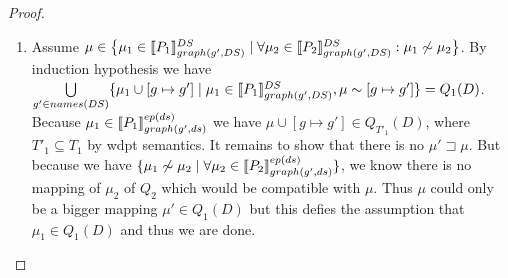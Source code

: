 \begin{proof}
\begin{enumerate}
\begin{enumerate}
				\item Assume $\mu \in \big\{ \mu_1 \in  \llbracket P_1 \rrbracket^{DS}_{graph(g',DS)} \mid 
					\forall \mu_2 \in \llbracket P_2 \rrbracket^{DS}_{graph(g',DS)}: \mu_1 \not\sim \mu_2 \big\}$. 
					By induction hypothesis we have 
					$\bigcup\limits_{g' \in names(DS)} 
					\{ \mu_1 \cup [g \mapsto g'] \mid \mu_1 \in
						\llbracket P_1\rrbracket^{DS}_{graph(g',DS)}, \mu \sim
					[g\mapsto g'] \}  = Q_1(D)$.
					Because $\mu_1 \in \llbracket P_1
					\rrbracket^{ep(ds)}_{graph(g',ds)}$ 
					we have $\mu\cup [g \mapsto g'] \in Q_{T'_1}(D)$, where
					$T'_1 \subseteq T_1$ by wdpt semantics.
					It remains to show that there
					is no $\mu' \sqsupset \mu$. But because we have $\{\mu_1 \not\sim \mu_2 \mid
					\forall \mu_2 \in \llbracket P_2 \rrbracket^{ep(ds)}_{graph(g',ds)} \}$, 
					we know there is no mapping
					of $\mu_2$ of $Q_2$ which would be compatible with $\mu$. Thus $\mu$ could
					only be a bigger mapping $\mu' \in Q_1(D)$ but this defies the
					assumption that $\mu_1 \in Q_1(D)$ and thus we are done.
			\end{enumerate}


\end{enumerate}
\end{proof}
